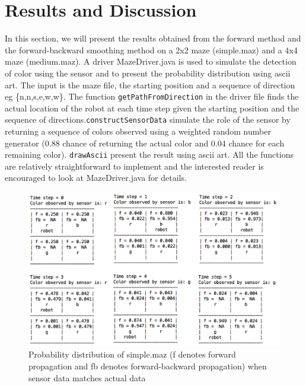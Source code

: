 \documentclass[9.5pt]{extarticle}
\begin{document}
\section{Results and Discussion}

In this section, we will present the results obtained from the forward method and the forward-backward smoothing method on a 2x2 maze (simple.maz) and a 4x4 maze (medium.maz). A driver MazeDriver.java is used to simulate the detection of color using the sensor and to present the probability distribution using ascii art. The input is the maze file, the starting position and a sequence of direction eg \{n,n,s,e,w,w\}. The function \verb`getPathFromDirection` in the driver file finds the actual location of the robot at each time step given the starting position and the sequence of directions.\verb`constructSensorData` simulate the role of the sensor by returning a sequence of colors observed using a weighted random number generator (0.88 chance of returning the actual color and 0.04 chance for each remaining color). \verb`drawAscii` present the result using ascii art. All the functions are relatively straightforward to implement and the interested reader is encouraged to look at MazeDriver.java for details.

\begin{figure}[H]
\centering
\includegraphics[scale=0.63]{simpleresult.png}
\caption{Probability distribution of simple.maz (f denotes forward propagation and fb denotes forward-backward propagation) when sensor data matches actual data}
\label{Figure 1}
\end{figure}
\end{document}
